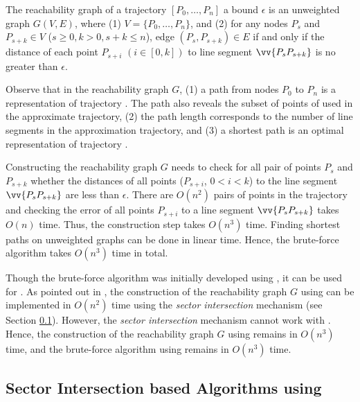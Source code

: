 The reachability graph of a trajectory ${[P_0, \ldots, P_n]}$ \wrt a bound $\epsilon$ is an unweighted graph $G(V, E)$, where (1) $V = \{P_0, \ldots, P_n\}$, and (2) for any nodes $P_s$ and $P_{s+k} \in V$ ($s\ge 0, k>0, s+k\le n$), edge $(P_s, P_{s+k}) \in E$ if and only if the distance of each point $P_{s+i}$ $(i\in[0,k])$ to line segment $\vv{P_sP_{s+k}}$ is no greater than $\epsilon$.

Observe that in the reachability graph $G$, (1) a path from nodes $P_0$ to $P_{n}$ is a representation of trajectory . The path also reveals the subset of points of  used in the approximate trajectory, (2) the path length corresponds to the number of line segments in the approximation trajectory, and
(3) a shortest path is an optimal representation of trajectory .

Constructing the reachability graph $G$ needs to check for all pair of points $P_s$ and $P_{s+k}$ whether the distances of all points ($P_{s+i}$, $0<i<k$) to the line segment $\vv{P_sP_{s+k}}$ are less than $\epsilon$.
There are $O(n^2)$ pairs of points in the trajectory and checking the error of all points $P_{s+i}$ to a line segment $\vv{P_sP_{s+k}}$ takes $O(n)$ time.
Thus, the construction step takes $O(n^3)$ time.
Finding shortest paths on unweighted graphs can be done in linear time. Hence, the brute-force algorithm takes $O(n^3)$ time in total.

%
Though the brute-force algorithm was initially developed using \ped, it can be used for \sed.
As pointed out in \cite{Chan:Optimal}, the construction of the reachability graph $G$ using \ped can be implemented in $O(n^2)$ time using the \textit{sector intersection} mechanism (see Section \ref{sub-ci-ped}). However, the \textit{sector intersection} mechanism cannot work with \sed.  Hence, the construction of the reachability graph $G$ using \sed remains in $O(n^3)$ time, and the brute-force algorithm using \sed remains in  $O(n^3)$ time.



\subsection{Sector Intersection based Algorithms using \ped}
\label{sub-ci-ped}


